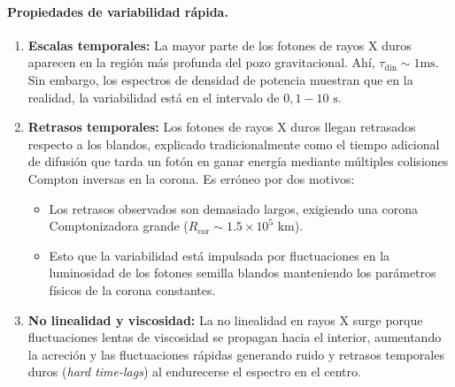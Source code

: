 \paragraph{Propiedades de variabilidad rápida.}

\begin{enumerate}
    \item \textbf{Escalas temporales:} La mayor parte de los fotones de rayos X duros aparecen en la región más profunda del pozo gravitacional. Ahí, $\tau_{\mbox{din}}\sim 1\mbox{ms}$. Sin embargo, los espectros de densidad de potencia muestran que en la realidad, la variabilidad está en el intervalo de $0,1-10\mbox{ s}$.
    \item \textbf{Retrasos temporales:} Los fotones de rayos X duros llegan retrasados respecto a los blandos, explicado tradicionalmente como el tiempo adicional de difusión que tarda un fotón en ganar energía mediante múltiples colisiones Compton inversas en la corona. Es erróneo por dos motivos:
    \begin{itemize}
        \item[$\bullet$] Los retrasos observados son demasiado largos, exigiendo una corona Comptonizadora grande ($R_{\mbox{cor}}\sim 1.5\times 10^5$ km).
        \item[$\bullet$] Esto que la variabilidad está impulsada por fluctuaciones en la luminosidad de los fotones semilla blandos manteniendo los parámetros físicos de la corona constantes.
    \end{itemize}
    \item \textbf{No linealidad y viscosidad:} La no linealidad en rayos X surge porque fluctuaciones lentas de viscosidad se propagan hacia el interior, aumentando la acreción y las fluctuaciones rápidas generando ruido y retrasos temporales duros (\textit{hard time-lags}) al endurecerse el espectro en el centro.
\end{enumerate}